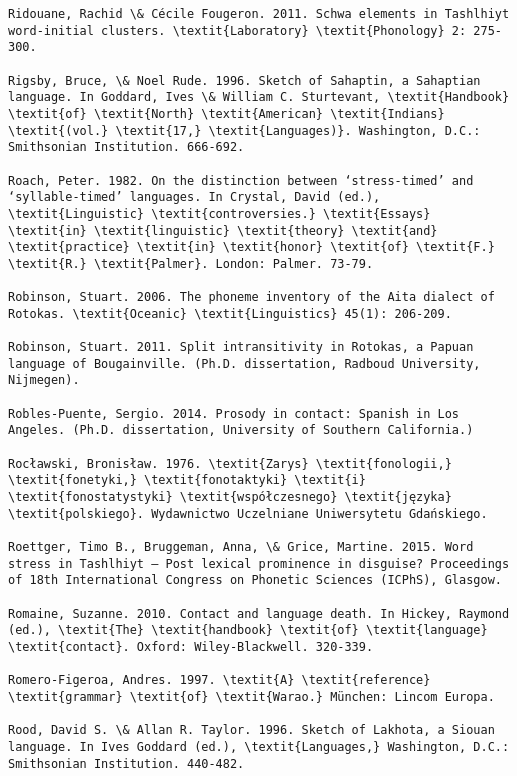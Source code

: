 \begin{verbatim}
Ridouane, Rachid \& Cécile Fougeron. 2011. Schwa elements in Tashlhiyt word-initial clusters. \textit{Laboratory} \textit{Phonology} 2: 275-300. 

Rigsby, Bruce, \& Noel Rude. 1996. Sketch of Sahaptin, a Sahaptian language. In Goddard, Ives \& William C. Sturtevant, \textit{Handbook} \textit{of} \textit{North} \textit{American} \textit{Indians} \textit{(vol.} \textit{17,} \textit{Languages)}. Washington, D.C.: Smithsonian Institution. 666-692.

Roach, Peter. 1982. On the distinction between ‘stress-timed’ and ‘syllable-timed’ languages. In Crystal, David (ed.), \textit{Linguistic} \textit{controversies.} \textit{Essays} \textit{in} \textit{linguistic} \textit{theory} \textit{and} \textit{practice} \textit{in} \textit{honor} \textit{of} \textit{F.} \textit{R.} \textit{Palmer}. London: Palmer. 73-79.

Robinson, Stuart. 2006. The phoneme inventory of the Aita dialect of Rotokas. \textit{Oceanic} \textit{Linguistics} 45(1): 206-209.

Robinson, Stuart. 2011. Split intransitivity in Rotokas, a Papuan language of Bougainville. (Ph.D. dissertation, Radboud University, Nijmegen).

Robles-Puente, Sergio. 2014. Prosody in contact: Spanish in Los Angeles. (Ph.D. dissertation, University of Southern California.)

Rocławski, Bronisław. 1976. \textit{Zarys} \textit{fonologii,} \textit{fonetyki,} \textit{fonotaktyki} \textit{i} \textit{fonostatystyki} \textit{współczesnego} \textit{języka} \textit{polskiego}. Wydawnictwo Uczelniane Uniwersytetu Gdańskiego.

Roettger, Timo B., Bruggeman, Anna, \& Grice, Martine. 2015. Word stress in Tashlhiyt – Post lexical prominence in disguise? Proceedings of 18th International Congress on Phonetic Sciences (ICPhS), Glasgow.

Romaine, Suzanne. 2010. Contact and language death. In Hickey, Raymond (ed.), \textit{The} \textit{handbook} \textit{of} \textit{language} \textit{contact}. Oxford: Wiley-Blackwell. 320-339.

Romero-Figeroa, Andres. 1997. \textit{A} \textit{reference} \textit{grammar} \textit{of} \textit{Warao.} München: Lincom Europa.

Rood, David S. \& Allan R. Taylor. 1996. Sketch of Lakhota, a Siouan language. In Ives Goddard (ed.), \textit{Languages,} Washington, D.C.: Smithsonian Institution. 440-482.


\end{verbatim}
